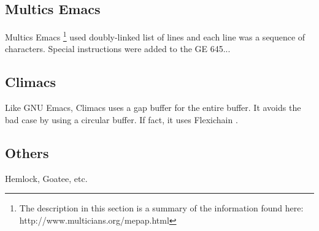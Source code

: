 \subsection{Multics Emacs}


Multics Emacs%
\footnote{The description in this section is a summary of the
  information found here: http://www.multicians.org/mepap.html}
used doubly-linked list of lines and each line was a
sequence of characters.  Special instructions were added to the GE
645...

\subsection{Climacs}

Like GNU Emacs, Climacs uses a gap buffer for the entire buffer.  It
avoids the bad case by using a circular buffer.  If fact, it uses
Flexichain \cite{flexichain}.

\subsection{Others}

Hemlock, Goatee, etc.

